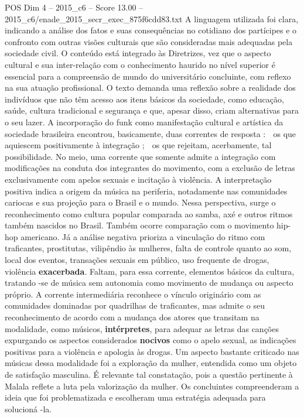 \begin{textsample}{POS Dim 4 – 2015\_c6 – Score 13.00 – 2015\_c6/enade\_2015\_secr\_exec\_875f6cdd83.txt}
A linguagem utilizada foi clara, indicando a análise dos fatos e suas consequências no cotidiano dos partícipes e o confronto com outras visões culturais que são consideradas mais adequadas pela sociedade civil.
O conteúdo está integrado às Diretrizes, vez que o aspecto cultural e sua inter-relação com o conhecimento haurido no nível superior é essencial para a compreensão de mundo do universitário concluinte, com reflexo na sua atuação profissional.
O texto demanda uma reflexão sobre a realidade dos indivíduos que não têm acesso aos itens básicos da sociedade, como educação, saúde, cultura tradicional e segurança e que, apesar disso, criam alternativas para o seu lazer.
A incorporação do funk como manifestação cultural e artística da sociedade brasileira encontrou, basicamente, duas correntes de resposta :  os que aquiescem positivamente à integração ;  os que rejeitam, acerbamente, tal possibilidade.
No meio, uma corrente que somente admite a integração com modificações na conduta dos integrantes do movimento, com a exclusão de letras exclusivamente com apelos sexuais e incitação à violência.
A interpretação positiva indica a origem da música na periferia, notadamente nas comunidades cariocas e sua projeção para o Brasil e o mundo.
Nessa perspectiva, surge o reconhecimento como cultura popular comparada ao samba, axé e outros ritmos também nascidos no Brasil.
Também ocorre comparação com o movimento hip-hop americano.
Já a análise negativa prioriza a vinculação do ritmo com traficantes, prostitutas, vilipêndio às mulheres, falta de controle quanto ao som, local dos eventos, transações sexuais em público, uso frequente de drogas, violência \textbf{exacerbada}.
Faltam, para essa corrente, elementos básicos da cultura, tratando -se de música sem autonomia como movimento de mudança ou aspecto próprio.
A corrente intermediária reconhece o vínculo originário com as comunidades dominadas por quadrilhas de traficantes, mas admite o seu reconhecimento de acordo com a mudança dos atores que transitam na modalidade, como músicos, \textbf{intérpretes}, para adequar as letras das canções expurgando os aspectos considerados \textbf{nocivos} como o apelo sexual, as indicações positivas para a violência e apologia às drogas.
Um aspecto bastante criticado nas músicas dessa modalidade foi a exploração da mulher, entendida como um objeto de satisfação masculina.
É relevante tal constatação, pois a questão pertinente à Malala reflete a luta pela valorização da mulher.
Os concluintes compreenderam a ideia que foi problematizada e escolheram uma estratégia adequada para solucioná -la.

\end{textsample}
